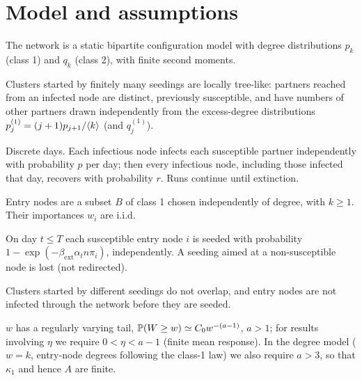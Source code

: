 \section{Model and assumptions}\label{sec:model}

\begin{assumption}[network]\label{as:net}
The network is a static bipartite configuration model with degree
distributions $p_k$ (class 1) and $q_k$ (class 2), with finite second moments.
\end{assumption}
\begin{assumption}\label{as:tree}
Clusters started by finitely many seedings are locally tree-like: partners
reached from an infected node are distinct, previously susceptible, and have
numbers of other partners drawn independently from the excess-degree
distributions $p^{(1)}_j=(j+1)p_{j+1}/\langle k\rangle$ (and $q^{(1)}_j$).
\end{assumption}
\begin{assumption}[transmission]\label{as:sir}
Discrete days. Each infectious node infects each susceptible partner
independently with probability $p$ per day; then every infectious node,
including those infected that day, recovers with probability $r$. Runs
continue until extinction.
\end{assumption}
\begin{assumption}\label{as:entry}
Entry nodes are a subset $B$ of class 1 chosen independently of degree, with
$k\ge1$. Their importances $w_i$ are i.i.d.
\end{assumption}
\begin{assumption}[forcing]\label{as:forcing}
On day $t\le T$ each susceptible entry node $i$ is seeded with probability
$1-\exp(-\beta_{\mathrm{ext}}\alpha_tn\pi_i)$, independently. A seeding aimed at a
non-susceptible node is lost (not redirected).
\end{assumption}
\begin{assumption}\label{as:indep}
Clusters started by different seedings do not overlap, and entry nodes are
not infected through the network before they are seeded.
\end{assumption}
\begin{assumption}[tail]\label{as:tail}
$w$ has a regularly varying tail, $\mathbb{P}(W\ge w)\simeq C_0w^{-(a-1)}$, $a>1$; for
results involving $\eta$ we require $0<\eta<a-1$ (finite mean response). In the degree
model ($w=k$, entry-node degrees following the class-1 law) we also require
$a>3$, so that $\kappa_1$ and hence $A$ are finite.
\end{assumption}

